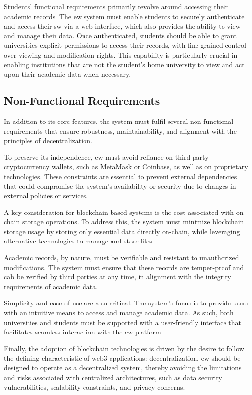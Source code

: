 Students' functional requirements primarily revolve around accessing their academic records. The \acrshort{ew} system must enable students to securely authenticate and access their \acrshort{sw} via a web interface, which also provides the ability to view and manage their data. Once authenticated, students should be able to grant universities explicit permissions to access their records, with fine-grained control over viewing and modification rights. This capability is particularly crucial in enabling institutions that are not the student's home university to view and act upon their academic data when necessary.

\subsection{Non-Functional Requirements}
In addition to its core features, the system must fulfil several non-functional requirements that ensure robustness, maintainability, and alignment with the principles of decentralization. 

To preserve its independence, \acrshort{ew} must avoid reliance on third-party cryptocurrency wallets, such as MetaMask or Coinbase, as well as on proprietary technologies. These constraints are essential to prevent external dependencies that could compromise the system’s availability or security due to changes in external policies or services.

A key consideration for blockchain-based systems is the cost associated with on-chain storage operations. To address this, the system must minimize blockchain storage usage by storing only essential data directly on-chain, while leveraging alternative technologies to manage and store files.

Academic records, by nature, must be verifiable and resistant to unauthorized modifications. The system must ensure that these records are temper-proof and cab be verified by third parties at any time, in alignment with the integrity requirements of academic data.

Simplicity and ease of use are also critical. The system's focus is to provide users with an intuitive means to access and manage academic data. As such, both universities and students must be supported with a user-friendly interface that facilitates seamless interaction with the \acrshort{ew} platform.

Finally, the adoption of blockchain technologies is driven by the desire to follow the defining characteristic of \Gls{web3} applications: decentralization. \acrshort{ew} should be designed to operate as a decentralized system, thereby avoiding the limitations and risks associated with centralized architectures, such as data security vulnerabilities, scalability constraints, and privacy concerns.

